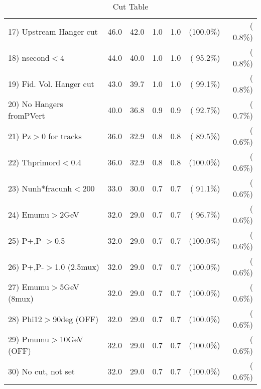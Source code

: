 \begin{table}[h!]
\begin{tabular}{||l||r|r|r|r|r|r||}
 17) Upstream Hanger cut  &         46.0 &         42.0 &          1.0 &          1.0 & (100.0\%) & (  0.8\%) \\
 18) nsecond$<$4          &         44.0 &         40.0 &          1.0 &          1.0 & ( 95.2\%) & (  0.8\%) \\
 19) Fid. Vol. Hanger cut &         43.0 &         39.7 &          1.0 &          1.0 & ( 99.1\%) & (  0.8\%) \\
 20) No Hangers fromPVert &         40.0 &         36.8 &          0.9 &          0.9 & ( 92.7\%) & (  0.7\%) \\
 21) Pz$>$0 for tracks    &         36.0 &         32.9 &          0.8 &          0.8 & ( 89.5\%) & (  0.6\%) \\
 22) Thprimord$<$0.4      &         36.0 &         32.9 &          0.8 &          0.8 & (100.0\%) & (  0.6\%) \\
 23) Nunh*fracunh$<$200   &         33.0 &         30.0 &          0.7 &          0.7 & ( 91.1\%) & (  0.6\%) \\
 24) Emumu$>$2GeV         &         32.0 &         29.0 &          0.7 &          0.7 & ( 96.7\%) & (  0.6\%) \\
 25) P+,P-$>$0.5          &         32.0 &         29.0 &          0.7 &          0.7 & (100.0\%) & (  0.6\%) \\
 26) P+,P-$>$1.0 (2.5mux) &         32.0 &         29.0 &          0.7 &          0.7 & (100.0\%) & (  0.6\%) \\
 27) Emumu$>$5GeV  (8mux) &         32.0 &         29.0 &          0.7 &          0.7 & (100.0\%) & (  0.6\%) \\
 28) Phi12$>$90deg  (OFF) &         32.0 &         29.0 &          0.7 &          0.7 & (100.0\%) & (  0.6\%) \\
 29) Pmumu$>$10GeV  (OFF) &         32.0 &         29.0 &          0.7 &          0.7 & (100.0\%) & (  0.6\%) \\
 30) No cut, not set      &         32.0 &         29.0 &          0.7 &          0.7 & (100.0\%) & (  0.6\%) \\
 \hline
 \hline
 \end{tabular}
 \caption{Cut Table           }
 \label{tab-cutcohjpsi-mumu_cohpip}
 \end{table}
